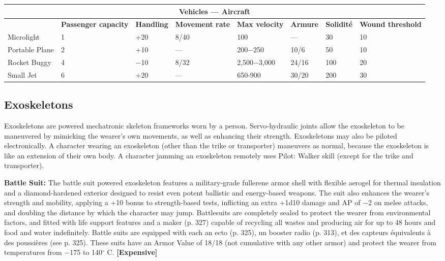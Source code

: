{{\begin{table} \begin{tabularx}{\textwidth}{|X|X|X|X|X|l|l|X|} \hline

\multicolumn{8}{|c|}{\textbf{Vehicles --- Aircraft}} \\ \hline

&\textbf{Passenger capacity}	&\textbf{Handling}	&\textbf{Movement rate}	&\textbf{Max velocity}	&\textbf{Armure}	&\textbf{Solidité}	&\textbf{Wound threshold} \\ \hline

Microlight	&1	&+20	&8/40	&100	&--- &30	&10 \\ \hline

Portable Plane	&2	&+10	&--- &200$-$250	&10/6	&50	&10 \\ \hline

Rocket Buggy	&4	&$-$10	&8/32	&2,500$-$3,000	&24/16	&100	&20 \\ \hline

Small Jet	&6	&+20	&--- &650-900	&30/20	&200	&30 \\ \hline

\end{tabularx} \label{tab:aircraft} \end{table} 



\subsection{Exoskeletons} \label{sec:exoskeletons} 

Exoskeletons are powered mechatronic skeleton frameworks worn by a person. Servo-hydraulic joints allow the exoskeleton to be maneuvered by mimicking the wearer’s own movements, as well as enhancing their strength. Exoskeletons may also be piloted electronically. A character wearing an exoskeleton (other than the trike or transporter) maneuvers as normal, because the exoskeleton is like an extension of their own body. A character jamming an exoskeleton remotely uses Pilot: Walker skill (except for the trike and transporter). 

\textbf{Battle Suit:} The battle suit powered exoskeleton features a military-grade fullerene armor shell with flexible aerogel for thermal insulation and a diamond-hardened exterior designed to resist even potent ballistic and energy-based weapons. The suit also enhances the wearer’s strength and mobility, applying a +10 bonus to strength-based tests, inflicting an extra +1d10 damage and AP of $-$2 on melee attacks, and doubling the distance by which the character may jump. Battlesuits are completely sealed to protect the wearer from environmental factors, and fitted with life support features and a maker (p. 327) capable of recycling all wastes and producing air for up to 48 hours and food and water indefinitely. Battle suits are equipped with each an ecto (p. 325), un booster  radio (p. 313), et des capteurs équivalents à des poussières (see p. 325). These suits have an Armor Value of 18/18 (not cumulative with any other armor) and protect the wearer from temperatures from $-$175 to 140$^{\circ}$ C. \textbf{[Expensive]} 

}}
